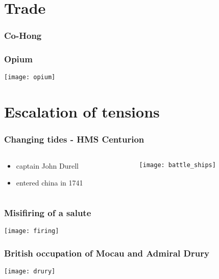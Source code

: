\documentclass[9pt]{beamer}
\begin{document}
\section{Trade
}
\begin{frame}
	\frametitle{Co-Hong}
	
\end{frame}

\begin{frame}
	\frametitle{Opium}
	
	\texttt{[image: opium]}

\end{frame}

\section{Escalation of tensions}

\begin{frame}
	\frametitle{Changing tides - HMS Centurion}

	\begin{columns}
	\begin{column}{.5\textwidth}
	\begin{itemize}
		\item captain John Durell
		\item entered china in 1741
	\end{itemize}
	\end{column}
	\begin{column}{.5\textwidth}
	\texttt{[image: battle\_ships]}
	\end{column}
	\end{columns}


\end{frame}

\begin{frame}
	\frametitle{Misifiring of a salute}

	\texttt{[image: firing]}
\end{frame}

\begin{frame}
	\frametitle{British occupation of Mocau and Admiral Drury}

	\centering
	\texttt{[image: drury]}
\end{frame}
\end{document}
